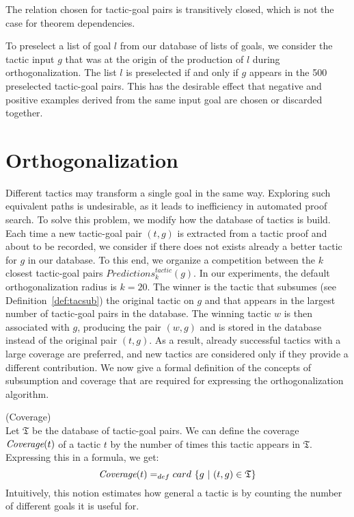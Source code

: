 \documentclass[runningheads,a4paper,draft]{svjour3}
\begin{document}
\begin{remark}
The relation chosen for tactic-goal pairs is transitively closed, which is not
the case for theorem dependencies.
\end{remark}

To preselect a list of goal $l$ from our database of lists of goals, we
consider the tactic input $g$ that was at the origin of the production of $l$
during orthogonalization. The list $l$
is preselected if and only if $g$ appears in the 500 preselected tactic-goal
pairs. This has the
desirable effect that negative and positive examples derived from the same
input goal are chosen or discarded together.

\section{Orthogonalization}\label{sec:ortho}
Different tactics may transform a single goal in the same way. Exploring such
equivalent paths
is undesirable, as it leads to inefficiency in automated proof search.
To solve this problem, we modify how the database of tactics is build.
Each time a new tactic-goal pair $(t,g)$ is extracted from a tactic proof and
about to be recorded, we consider if there does not exists already a better
tactic for $g$ in our database. To this end, we organize a competition between
the
$k$ closest tactic-goal pairs $\mathit{Predictions}^{\mathit{tactic}}_k(g)$.
In our experiments,
the default orthogonalization radius is $k=20$.
The winner is the tactic that subsumes (see Definition~\ref{def:tacsub}) the
original tactic on $g$ and that
appears in the largest number of tactic-goal pairs in the database.
The winning tactic $w$ is then associated with $g$, producing the pair $(w,g)$
and is stored in the database instead of the original pair $(t,g)$.
As a result, already successful tactics with a large coverage are preferred,
and new tactics are considered only if they provide a different contribution.
We now give a formal definition of the concepts of subsumption and coverage
that are required for expressing the orthogonalization algorithm.

\begin{definition} (Coverage)\\
Let $\mathfrak{T}$ be the database of tactic-goal pairs. We can define the
coverage $\textit{\mbox{Coverage}}(t)$ of a tactic $t$ by the number of times
this tactic
appears in
$\mathfrak{T}$. Expressing this in a formula, we get:
  \[\textit{\mbox{Coverage}}(t) =_{def} card\ \lbrace g\ |\ (t,g) \in
  \mathfrak{T} \rbrace \]
Intuitively, this notion estimates how general a tactic is by counting the
number of different goals it is useful for.
\end{definition}
\end{document}
